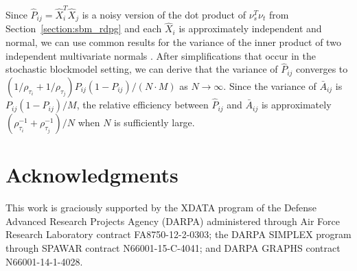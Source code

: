 \documentclass[10pt,letterpaper]{article}
\renewcommand{\hat}{\widehat}
\begin{document}
Since $\hat{P}_{ij} = \hat{X}_i^T \hat{X}_j$ is a noisy version of the dot product of $\nu_s^T \nu_t$ from Section~\ref{section:sbm_rdpg} and each $\hat{X}_i$ is approximately independent and normal, we can use common results for the variance of the inner product of two independent multivariate normals \cite{brown1977means}.
After simplifications that occur in the stochastic blockmodel setting, we can derive that the variance of $\hat{P}_{ij}$ converges to $\left( 1/\rho_{\tau_i} + 1/\rho_{\tau_j} \right) P_{ij} (1-P_{ij})/(N \cdot M)$ as $N \rightarrow \infty$. 
Since the variance of $\bar{A}_{ij}$ is $P_{ij} (1-P_{ij})/M$, the relative efficiency between $\hat{P}_{ij}$ and $\bar{A}_{ij}$ is approximately $(\rho_{\tau_i}^{-1} + \rho_{\tau_j}^{-1})/N$ when $N$ is sufficiently large.
    

\section*{Acknowledgments}

This work is graciously supported by the XDATA program of the Defense
Advanced Research Projects Agency (DARPA) administered through Air
Force Research Laboratory contract FA8750-12-2-0303; the DARPA SIMPLEX
program through SPAWAR contract N66001-15-C-4041; and DARPA GRAPHS
contract N66001-14-1-4028.

\nolinenumbers


\end{document}
